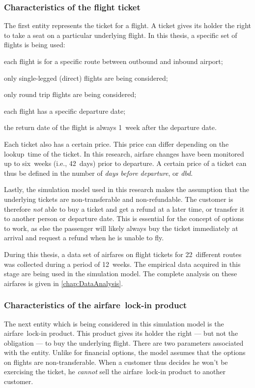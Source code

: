 \subsubsection{Characteristics of the flight ticket}
\label{sub:CharacteristicsOfTheFlightTicket}
The first entity represents the ticket for a flight. A ticket gives its holder the right to take a seat on a particular underlying flight. In this thesis, a specific set of flights is being used:

\begin{compactitem}
\item each flight is for a specific route between outbound and inbound airport;
\item only single-legged (direct) flights are being considered;
\item only round trip flights are being considered;
\item each flight has a specific departure date;
\item the return date of the flight is always 1~week after the departure date.
\end{compactitem}

\vspace{1em}

Each ticket also has a certain price. This price can differ depending on the lookup~time of the ticket. In this research, airfare changes have been monitored up to six~weeks (i.e., 42~days) prior to departure. A certain price of a ticket can thus be defined in the number of \emph{days before departure}, or \emph{dbd}.

Lastly, the simulation model used in this research makes the assumption that the underlying tickets are non-transferable and non-refundable. The customer is therefore \emph{not} able to buy a ticket and get a refund at a later time, or transfer it to another person or departure date. This is essential for the concept of options to work, as else the passenger will likely always buy the ticket immediately at arrival and request a refund when he is unable to fly.

During this thesis, a data set of airfares on flight tickets for 22~different routes was collected during a period of 12~weeks. The empirical data acquired in this stage are being used in the simulation model. The complete analysis on these airfares is given in \autoref{chap:DataAnalysis}.


\subsubsection{Characteristics of the airfare~lock-in product}
The next entity which is being considered in this simulation model is the airfare~lock-in product. This product gives its holder the right --- but not the obligation --- to buy the underlying flight. There are two parameters associated with the entity. Unlike for financial options, the model assumes that the options on flights are non-transferable. When a customer thus decides he won't be exercising the ticket, he \emph{cannot} sell the airfare~lock-in product to another customer.

